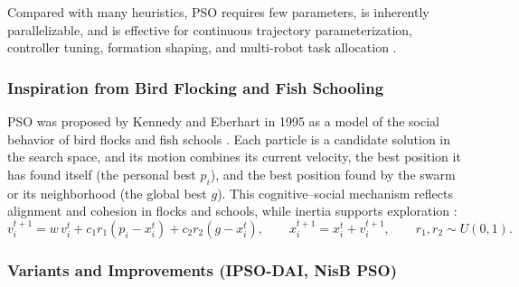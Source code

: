 Compared with many heuristics, PSO requires few parameters, is inherently
parallelizable, and is effective for continuous trajectory parameterization,
controller tuning, formation shaping, and multi-robot task allocation \cite{chen2019path}.

\subsubsection{Inspiration from Bird Flocking and Fish Schooling}

PSO was proposed by Kennedy and Eberhart in 1995 as a model of the social
behavior of bird flocks and fish schools \cite{kennedy1995particle}. Each particle
is a candidate solution in the search space, and its motion combines its current
velocity, the best position it has found itself (the personal best $p_i$), and
the best position found by the swarm or its neighborhood (the global best $g$).
This cognitive--social mechanism reflects alignment and cohesion in flocks and
schools, while inertia supports exploration
\cite{nguyen2024swarm,poli2007particle}:
\begin{equation}
  v_i^{t+1} = w\,v_i^{t} + c_1 r_1\left(p_i - x_i^{t}\right)
              + c_2 r_2\left(g - x_i^{t}\right), \qquad
  x_i^{t+1} = x_i^{t} + v_i^{t+1}, \qquad
  r_1, r_2 \sim U(0,1).
  \label{eq:pso}
\end{equation}

\subsubsection{Variants and Improvements (IPSO-DAI, NisB PSO)}

